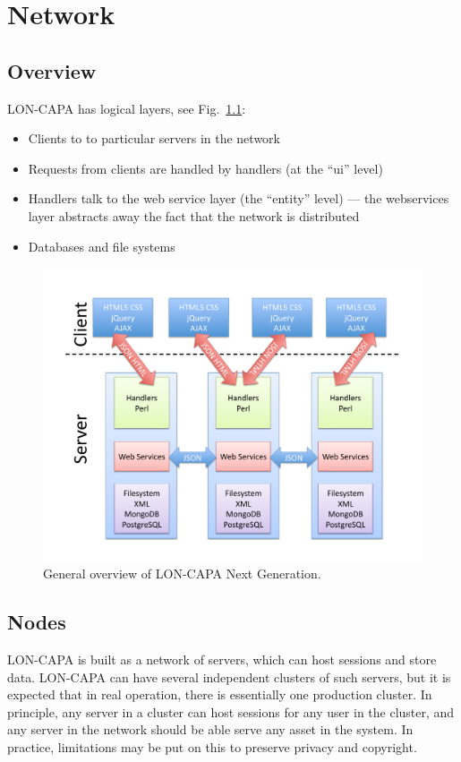 \chapter{Network}

\section{Overview}
LON-CAPA has logical layers, see Fig.~\ref{fig:overview}:
\begin{itemize}
\item Clients to to particular servers in the network
\item Requests from clients are handled by handlers (at the ``ui'' level)
\item Handlers talk to the web service layer (the ``entity'' level) --- the webservices layer abstracts away the fact that the network is distributed
\item Databases and file systems
\end{itemize} 

\begin{figure}
\begin{center}
\includegraphics[width=12cm]{overview}
\end{center}
\caption{General overview of LON-CAPA Next Generation.\label{fig:overview}} 
\end{figure}

\section{Nodes}
LON-CAPA is built as a network of servers, which can host sessions and store data. LON-CAPA can have several independent clusters of such servers, but it is expected that in real operation, there is essentially one production cluster. In principle, any server in a cluster can host sessions for any user in the cluster, and any server in the network should be able serve any asset in the system. In practice, limitations may be put on this to preserve privacy and copyright.

